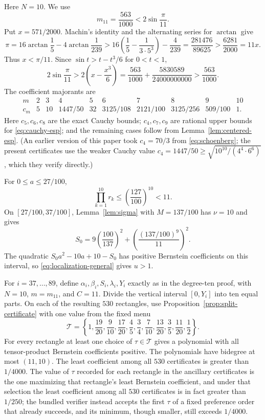 \documentclass[11pt]{article}
\theoremstyle{remark}
\begin{document}
Here $N=10$.  We use
\[
 m_{11}=\frac{563}{1000}<2\sin\frac\pi{11}.
\]
Put $x=571/2000$.  Machin's identity and the alternating series for
$\arctan$ give
\[
 \pi=16\arctan\frac15-4\arctan\frac1{239}
 >16\left(\frac15-\frac1{3\cdot5^3}\right)-\frac4{239}
 =\frac{281476}{89625}
 >\frac{6281}{2000}=11x.
\]
Thus $x<\pi/11$.  Since $\sin t>t-t^3/6$ for $0<t<1$,
\[
 2\sin\frac\pi{11}
 >2\left(x-\frac{x^3}{6}\right)
 =\frac{563}{1000}+\frac{5830589}{24000000000}
 >\frac{563}{1000}.
\]  The coefficient majorants are
\begin{equation}\label{eq:c11}
\begin{array}{c|ccccccccc}
 m&2&3&4&5&6&7&8&9&10\\ \hline
 c_m&5&10&1447/50&32&3125/108&2121/100&3125/256&509/100&1.
\end{array}
\end{equation}
Here $c_5,c_6,c_8$ are the exact
Cauchy bounds; $c_4,c_7,c_9$ are rational upper bounds for
\eqref{eq:cauchy-esp}; and the remaining cases follow from
Lemma~\ref{lem:centered-esp}.  (An earlier version of this paper took
$c_4=70/3$ from \eqref{eq:schoenberg}; the present certificates use the
weaker Cauchy value $c_4=1447/50\ge\sqrt{10^{10}/(4^4\cdot6^6)}$, which
they verify directly.)

For $0\le a\le27/100$,
\[
 \prod_{k=1}^{10}r_k\le\left(\frac{127}{100}\right)^{10}<11.
\]
On $[27/100,37/100]$, Lemma~\ref{lem:sigma} with $M=137/100$ has
$\nu=10$ and gives
\[
 S_0=9\left(\frac{100}{137}\right)^2
 +\left(\frac{(137/100)^9}{11}\right)^2.
\]
The quadratic $S_0a^2-10a+10-S_0$ has positive Bernstein coefficients on
this interval, so \eqref{eq:localization-general} gives $u>1$.

For $i=37,\ldots,89$, define
$\alpha_i,\beta_i,S_i,\lambda_i,Y_i$ exactly as in the degree-ten proof,
with $N=10$, $m=m_{11}$, and $C=11$.  Divide the vertical interval
$[0,Y_i]$ into ten equal parts.  On each of the resulting $530$ rectangles,
use Proposition~\ref{prop:split-certificate} with one value from the fixed
menu
\[
 \mathcal T=\left\{
 1,\frac{19}{20},\frac9{10},\frac{17}{20},\frac45,\frac34,
 \frac7{10},\frac{13}{20},\frac35,\frac{11}{20},\frac12
 \right\}.
\]
For every rectangle at least one choice of $\tau\in\mathcal T$ gives a
polynomial with all tensor-product Bernstein coefficients positive.  The
polynomials have bidegree at most $(11,10)$.  The least coefficient among all
$530$ certificates is greater than $1/4000$.  The value of $\tau$ recorded for
each rectangle in the ancillary certificates is the one maximizing that
rectangle's least Bernstein coefficient, and under that selection the least
coefficient among all $530$ certificates is in fact greater than $1/250$; the
bundled verifier instead accepts the first $\tau$ of a fixed preference order
that already succeeds, and its minimum, though smaller, still exceeds
$1/4000$.
\end{document}
